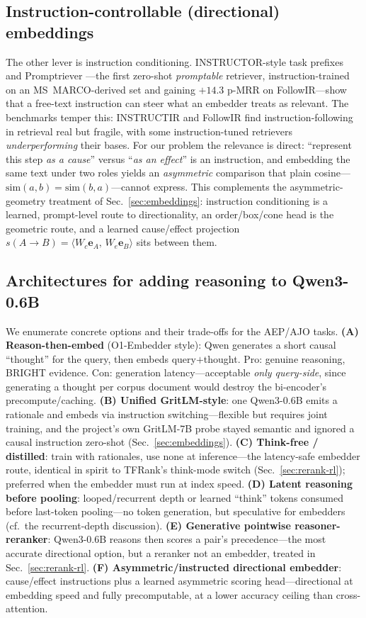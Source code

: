 \subsection{Instruction-controllable (directional) embeddings}
\label{sec:re:instruct}
The other lever is instruction conditioning. INSTRUCTOR-style task prefixes and
Promptriever \citep{re:weller2024promptriever}---the first zero-shot \emph{promptable}
retriever, instruction-trained on an MS~MARCO-derived set and gaining $+14.3$ p-MRR on
FollowIR---show that a free-text instruction can steer what an embedder treats as
relevant. The benchmarks temper this: INSTRUCTIR \citep{re:oh2024instructir} and FollowIR
\citep{re:weller2024followir} find instruction-following in retrieval real but fragile,
with some instruction-tuned retrievers \emph{underperforming} their bases. For our
problem the relevance is direct: ``represent this step \emph{as a cause}'' versus
``\emph{as an effect}'' is an instruction, and embedding the same text under two roles
yields an \emph{asymmetric} comparison that plain cosine---$\mathrm{sim}(a,b)=\mathrm{sim}(b,a)$---cannot
express. This complements the asymmetric-geometry treatment of Sec.~\ref{sec:embeddings}:
instruction conditioning is a learned, prompt-level route to directionality, an
order/box/cone head is the geometric route, and a learned cause/effect projection
$s(A\!\to\!B)=\langle W_c\mathbf{e}_A,\,W_e\mathbf{e}_B\rangle$ sits between them.

\subsection{Architectures for adding reasoning to Qwen3-0.6B}
\label{sec:re:arch}
We enumerate concrete options and their trade-offs for the AEP/AJO tasks.
\textbf{(A) Reason-then-embed} (O1-Embedder style): Qwen generates a short causal
``thought'' for the query, then embeds query$+$thought. Pro: genuine reasoning, BRIGHT
evidence. Con: generation latency---acceptable \emph{only query-side}, since generating
a thought per corpus document would destroy the bi-encoder's precompute/caching.
\textbf{(B) Unified GritLM-style}: one Qwen3-0.6B emits a rationale and embeds via
instruction switching---flexible but requires joint training, and the project's own
GritLM-7B probe stayed semantic and ignored a causal instruction zero-shot
(Sec.~\ref{sec:embeddings}). \textbf{(C) Think-free / distilled}: train with rationales,
use none at inference---the latency-safe embedder route, identical in spirit to TFRank's
think-mode switch (Sec.~\ref{sec:rerank-rl}); preferred when the embedder must run at
index speed. \textbf{(D) Latent reasoning before pooling}: looped/recurrent depth or
learned ``think'' tokens consumed before last-token pooling---no token generation, but
speculative for embedders (cf.\ the recurrent-depth discussion). \textbf{(E) Generative
pointwise reasoner-reranker}: Qwen3-0.6B reasons then scores a pair's precedence---the
most accurate directional option, but a reranker not an embedder, treated in
Sec.~\ref{sec:rerank-rl}. \textbf{(F) Asymmetric/instructed directional embedder}:
cause/effect instructions plus a learned asymmetric scoring head---directional at
embedding speed and fully precomputable, at a lower accuracy ceiling than cross-attention.


